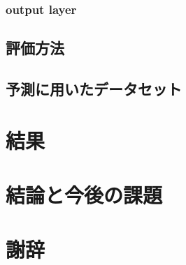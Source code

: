 \documentclass[a4paper,12pt]{jsreport}
\begin{document}
\subsection{output layer}


\section{評価方法}
\section{予測に用いたデータセット}

\chapter{結果}

\chapter{結論と今後の課題}

\chapter{謝辞}
\end{document}
